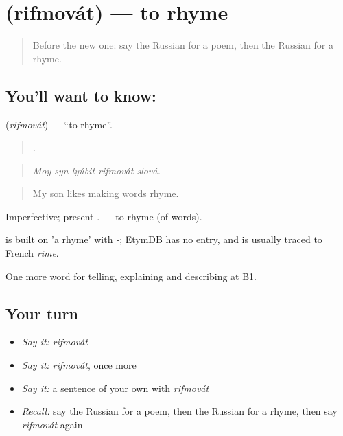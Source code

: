 \section[\texorpdfstring{\ru{рифмовать} (rifmovát)}{рифмовать (rifmovát)}]{ (rifmovát) — to rhyme}

\label{lesson:RU-C525-rifmovat}



\begin{quote}
Before the new one: say the Russian for a poem, then the Russian for a rhyme.
\end{quote}

\subsection*{You'll want to know: }
\textbf{} (\emph{rifmovát}) — \textquotedblleft{}to rhyme\textquotedblright{}.

\begin{quote}
    .
\end{quote}

\begin{quote}
\emph{Moy syn lyúbit rifmovát slová.}
\end{quote}

\begin{quote}
My son likes making words rhyme.
\end{quote}

Imperfective; present . \emph{} — to rhyme (of words).

\begin{cousinweb}
\emph{} is built on \emph{} 'a rhyme' with \emph{-}; EtymDB has no entry, and \emph{} is usually traced to French \emph{rime}.
\end{cousinweb}

\begin{grammarlens}[title={What you've built}]
One more word for telling, explaining and describing at B1.
\end{grammarlens}

\subsection*{Your turn}
\begin{itemize}
\raggedright
  \item \emph{Say it:} \emph{rifmovát}
  \item \emph{Say it:} \emph{rifmovát}, once more
  \item \emph{Say it:} a sentence of your own with \emph{rifmovát}
  \item \emph{Recall:} say the Russian for a poem, then the Russian for a rhyme, then say \emph{rifmovát} again
\end{itemize}


